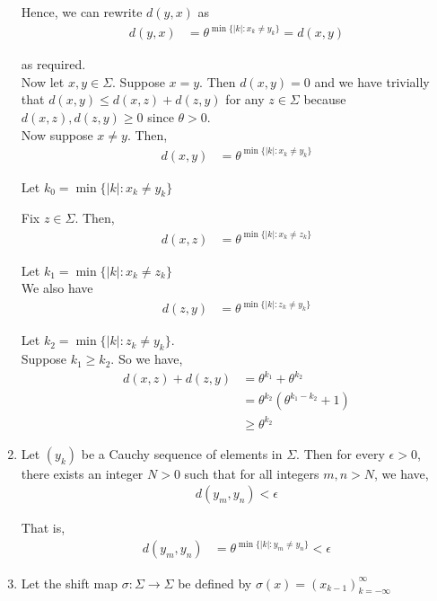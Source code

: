 \documentclass[12pt]{article}
\begin{document}
\begin{enumerate}[label=(\alph*)]
Hence, we can rewrite $d(y, x)$ as
\begin{align*}
d(y, x) &= \theta^{\min\{|k|: x_k \neq y_k\}} = d(x, y)
\end{align*}

as required.\\

Now let $x, y \in \Sigma$. Suppose $x = y$. Then $d(x, y) = 0$ and we have trivially that $d(x, y) \leq d(x, z) + d(z, y)$ for any $z \in \Sigma$ because $d(x, z), d(z, y) \geq 0$ since $\theta > 0$.\\

Now suppose $x \neq y$. Then,
\begin{align*}
d(x, y) &= \theta^{\min\{|k|: x_k \neq y_k\}}
\end{align*}

Let $k_0 = \min\{|k|: x_k \neq y_k\}$

Fix $z \in \Sigma$. Then,
\begin{align*}
d(x, z) &= \theta^{\min\{|k|: x_k \neq z_k\}}
\end{align*}

Let $k_1 = \min\{|k|: x_k \neq z_k\}$\\

We also have
\begin{align*}
d(z, y) &= \theta^{\min\{|k|: z_k \neq y_k\}}
\end{align*}

Let $k_2 = \min\{|k|: z_k \neq y_k\}$.\\

Suppose $k_1 \geq k_2$. So we have,
\begin{align*}
d(x, z) + d(z, y) &= \theta^{k_1} + \theta^{k_2}\\
&= \theta^{k_2}(\theta^{k_1-k_2} + 1)\\
&\geq \theta^{k_2}
\end{align*}

\item Let $(y_k)$ be a Cauchy sequence of elements in $\Sigma$. Then for every $\epsilon > 0$, there exists an integer $N > 0$ such that for all integers $m, n > N$, we have,
\begin{align*}
d(y_m, y_n) < \epsilon
\end{align*}

That is,
\begin{align*}
d(y_m, y_n) &= \theta^{\min\{|k|: y_m \neq y_n\}} < \epsilon
\end{align*}

\item Let the shift map $\sigma: \Sigma \to \Sigma$ be defined by $\sigma(x) = (x_{k-1})_{k=-\infty}^{\infty}$
\end{enumerate}
\end{document}
